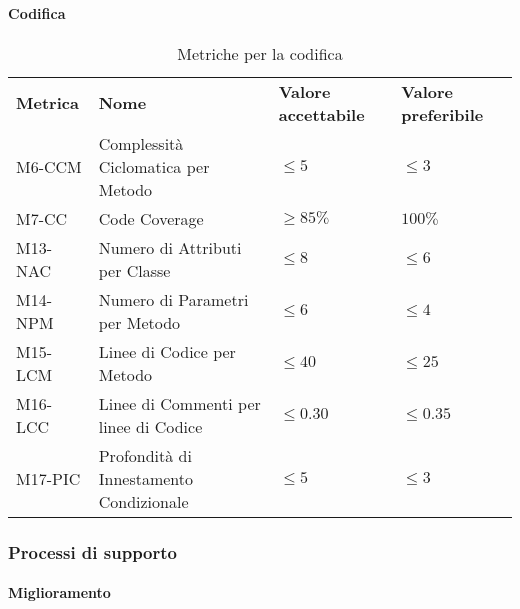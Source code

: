 \paragraph{Codifica}

\begin{table}[h]
    \begin{adjustbox}{width=\textwidth}
    \centering
    \renewcommand{\arraystretch}{1.5}
    \begin{tabular}{>{\centering\arraybackslash} m{2cm} >{\centering\arraybackslash} m{6cm} >{\centering\arraybackslash} m{3cm} >{\centering\arraybackslash} m{3cm}}
    \rowcolor[HTML]{bfbfbf} 
    \textbf{Metrica} & \textbf{Nome} & \textbf{Valore accettabile} & \textbf{Valore preferibile} \\
    M6-CCM & Complessità Ciclomatica per Metodo & $\le 5$ & $\le 3$\\
    M7-CC  & Code Coverage & $\ge 85\%$ & $100\%$ \\
    M13-NAC & Numero di Attributi per Classe & $\le 8$ & $\le 6$ \\
    M14-NPM & Numero di Parametri per Metodo & $\le 6$ & $\le 4$ \\
    M15-LCM & Linee di Codice per Metodo & $\le 40$ & $\le 25$ \\
    M16-LCC & Linee di Commenti per linee di Codice & $\le 0.30$ & $\le 0.35$\\
    M17-PIC & Profondità di Innestamento Condizionale & $\le 5$ & $\le 3$\\
    \end{tabular}
    \end{adjustbox}
    \caption{Metriche per la codifica}
\end{table}

\clearpage


\subsubsection{Processi di supporto} \label{processi di supporto}

\paragraph{Miglioramento}

